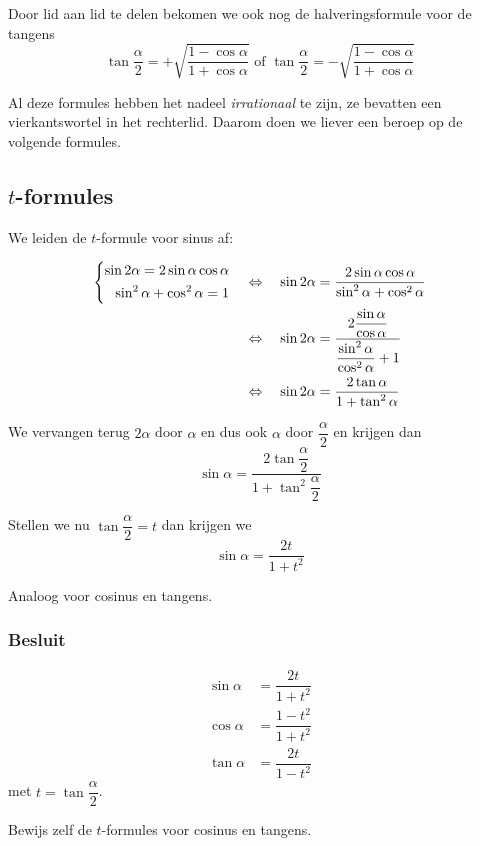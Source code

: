 \documentclass[a4paper,12pt]{article}
\begin{document}
\begin{theorie}
Door lid aan lid te delen bekomen we ook nog de halveringsformule voor de tangens
$$\tan\dfrac{\alpha}{2} = +\sqrt{\dfrac{1-\cos\alpha}{1+\cos\alpha}} \mbox{ of } \tan\dfrac{\alpha}{2} = -\sqrt{\dfrac{1-\cos\alpha}{1+\cos\alpha}}$$

Al deze formules hebben het nadeel {\em irrationaal} te zijn, ze bevatten een vierkantswortel in het rechterlid.
Daarom doen we liever een beroep op de volgende formules.

\subsection{$t$-formules}

We leiden de $t$-formule voor sinus af:

\begin{align*}
  \left\{\begin{aligned}\sin 2\alpha = 2\sin\alpha\cos\alpha\\\sin^2\alpha + \cos^2\alpha = 1\end{aligned}\right. \quad
  &\Leftrightarrow\quad \sin 2\alpha = \dfrac{2\sin\alpha\cos\alpha}{\sin^2\alpha + \cos^2\alpha}\\
  &\Leftrightarrow\quad \sin 2\alpha = \dfrac{2\dfrac{\sin\alpha}{\cos\alpha}}{\dfrac{\sin^2\alpha}{\cos^2\alpha}+1}\\
  &\Leftrightarrow\quad \sin 2\alpha = \dfrac{2\tan\alpha}{1+\tan^2\alpha}
\end{align*}

We vervangen terug $2\alpha$ door $\alpha$ en dus ook $\alpha$ door $\dfrac{\alpha}{2}$ en krijgen dan
$$\sin\alpha = \dfrac{2\tan\dfrac{\alpha}{2}}{1+\tan^2\dfrac{\alpha}{2}}$$

Stellen we nu $\tan\dfrac{\alpha}{2}=t$ dan krijgen we
$$\sin\alpha = \dfrac{2t}{1+t^2}$$

Analoog voor cosinus en tangens.

\subsubsection*{Besluit}
\begin{align*}
  \sin\alpha &= \dfrac{2t}{1+t^2}\\
  \cos\alpha &= \dfrac{1-t^2}{1+t^2}\\
  \tan\alpha &= \dfrac{2t}{1-t^2}
\end{align*}
met $t=\tan \dfrac{\alpha}{2}$.

\end{theorie}

\begin{oefening}
Bewijs zelf de $t$-formules voor cosinus en tangens.
\end{oefening}
\end{document}
